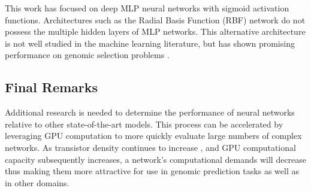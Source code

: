 This work has focused on deep MLP neural networks with sigmoid activation functions.
Architectures such as the Radial Basis Function (RBF) network do not possess the multiple hidden
layers of MLP networks. This alternative architecture is not well studied in the machine learning 
literature, but has shown promising performance on genomic selection 
problems \citep{gonzalez-camacho2012}.

\subsection*{Final Remarks}

Additional research is needed to determine the performance of 
neural networks relative to other state-of-the-art models. This process can
be accelerated by leveraging GPU computation to more quickly evaluate
large numbers of complex networks. As transistor density continues to
increase \citep{moore1965}, and GPU computational capacity subsequently
increases, a network's computational demands will decrease thus making them more
attractive for use in genomic prediction tasks as well as in other domains.

